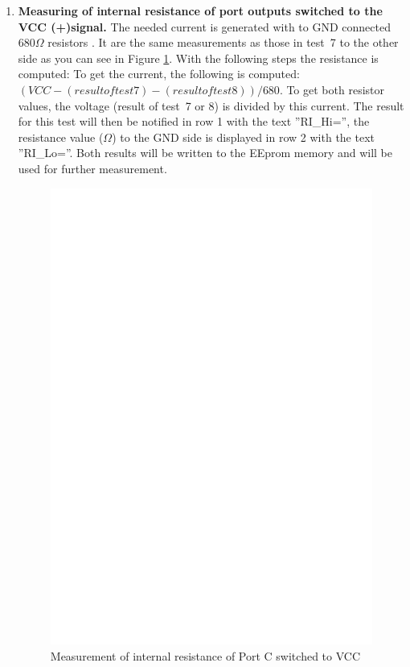 \begin{enumerate}
\item {\bf Measuring of internal resistance of port outputs switched to the VCC (+)signal.}
The needed current is generated with to GND connected \(680\Omega\) resistors .
It are the same measurements as those in test~7 to the other side as you can see in Figure \ref{fig:test8}.
With the following steps the resistance is computed:
To get the current, the following is computed:  \((VCC - (result of test 7) - (result of test 8)) / 680\).
To get both resistor values, the voltage (result of test~7 or 8) is divided by this current.
The result for this test will then be notified in row 1 with the text ''RI\_Hi='', the resistance value (\(\Omega\)) to the GND side is
displayed in row 2 with the text ''RI\_Lo=''.
Both results will be written to the EEprom memory and will be used for further measurement.

\begin{figure}[H]
\centering
\includegraphics[]{../FIG/Test8.eps}
\caption{Measurement of internal resistance of Port C switched to VCC }
\label{fig:test8}
\end{figure}


\end{enumerate}
